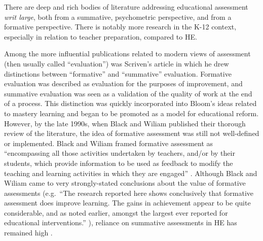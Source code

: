\documentclass[
]{book}
\begin{document}
There are deep and rich bodies of literature addressing educational assessment \emph{writ large}, both from a summative, psychometric perspective, and from a formative perspective. There is notably more research in the K-12 context, especially in relation to teacher preparation, compared to HE.

Among the more influential publications related to modern views of assessment (then usually called ``evaluation'') was Scriven's \citeyearpar{scrivenMethodologyEvaluation1967} article in which he drew distinctions between ``formative'' and ``summative'' evaluation. Formative evaluation was described as evaluation for the purposes of improvement, and summative evaluation was seen as a validation of the quality of work at the end of a process. This distinction was quickly incorporated into Bloom's \citeyearpar{bloomLearningMasteryInstruction1968} ideas related to mastery learning and began to be promoted as a model for educational reform. However, by the late 1990s, when Black and Wiliam \citeyearpar{blackAssessmentClassroomLearning1998} published their thorough review of the literature, the idea of formative assessment was still not well-defined or implemented. Black and Wiliam framed formative assessment as ``encompassing all those activities undertaken by teachers, and/or by their students, which provide information to be used as feedback to modify the teaching and learning activities in which they are engaged'' \citeyearpar[p.~7-8]{blackAssessmentClassroomLearning1998}. Although Black and Wiliam came to very strongly-stated conclusions about the value of formative assessments (e.g.~``The research reported here shows conclusively that formative assessment does improve learning. The gains in achievement appear to be quite considerable, and as noted earlier, amongst the largest ever reported for educational interventions.'' \citeyearpar[p.~61]{blackAssessmentClassroomLearning1998}), reliance on summative assessments in HE has remained high \citep[\citet{lipnevichWhatGradesMean2020}]{harlenSystematicReviewImpact2002}.
\end{document}
